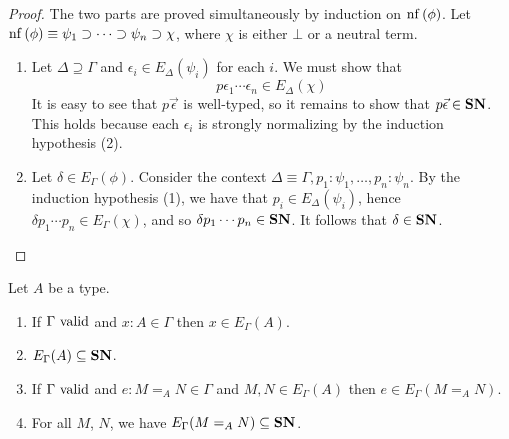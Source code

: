 \begin{proof}
The two parts are proved simultaneously by induction on $\mathrm{nf} \left( {\phi} \right)$.
Let $\mathrm{nf} \left( {\phi} \right) \equiv \psi_1 \supset \cdots \supset \psi_n \supset \chi$,
where $\chi$ is either $\bot$ or a neutral term.  
\begin{enumerate}
\item
Let $\Delta \supseteq \Gamma$ and $\epsilon_i \in E_\Delta(\psi_i)$ for
each $i$.  We must show that
\[ p \epsilon_1 \cdots \epsilon_n \in E_\Delta(\chi) \]
It is easy to see that $p \vec{\epsilon}$ is well-typed, so it remains to show that $p \vec{\epsilon} \in \mathbf{SN}$.
This holds because each $\epsilon_i$ is strongly normalizing by the induction hypothesis (2).
\item
Let $\delta \in E_\Gamma(\phi)$.  Consider the context $\Delta \equiv \Gamma, p_1 : \psi_1, \ldots, p_n : \psi_n$.
By the induction hypothesis (1), we have that $p_i \in E_\Delta(\psi_i)$, hence
$\delta p_1 \cdots p_n \in E_\Gamma(\chi)$, and so $\delta p_1 \cdots p_n \in \mathbf{SN}$.
It follows that $\delta \in \mathbf{SN}$.
\end{enumerate}
\end{proof}

\begin{lemma}
\label{lm:varcompute2}
Let $A$ be a type.
\begin{enumerate}
\item
If $\Gamma \ \mathrm{valid}$ and $x : A \in \Gamma$ then $x \in E_\Gamma(A)$.
\item
$E_\Gamma(A) \subseteq \mathbf{SN}$.
\item
If $\Gamma \ \mathrm{valid}$ and $e : M =_A N \in \Gamma$ and $M, N \in E_\Gamma(A)$ then $e \in E_\Gamma(M =_A N)$.
\item
For all $M$, $N$, we have $E_\Gamma(M =_A N) \subseteq \mathbf{SN}$.
\end{enumerate}
\end{lemma}

